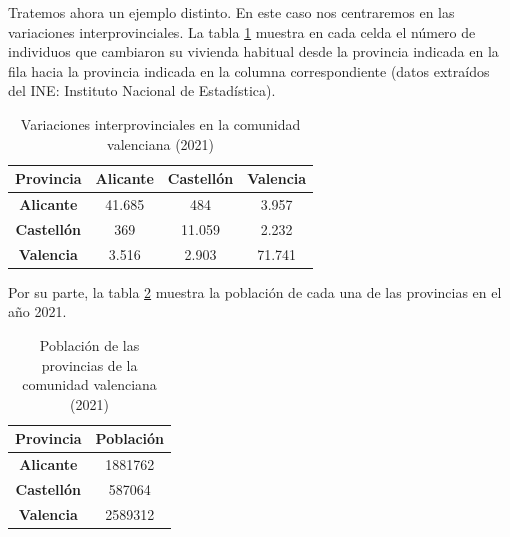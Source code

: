 \begin{ejemplo}
    Tratemos ahora un ejemplo distinto. En este caso nos centraremos en las variaciones interprovinciales. La tabla \ref{tab:variaciones} muestra en cada celda el número de individuos que cambiaron su vivienda habitual desde la provincia indicada en la fila hacia la provincia indicada en la columna correspondiente (datos extraídos del INE: Instituto Nacional de Estadística).

    \begin{table}[h]
        \centering
        \begin{tabular}{cccc}\hline
            \textbf{Provincia} & \textbf{Alicante} & \textbf{Castellón} & \textbf{Valencia} \\ \hline\hline
        \textbf{Alicante}                  & 41.685                    & 484                         & 3.957                      \\ \hline
        \textbf{Castellón}                & 369                       & 11.059                      & 2.232                      \\ \hline
        \textbf{Valencia}                & 3.516                     & 2.903                       & 71.741 \\ \hline            
        \end{tabular}
        \caption{Variaciones interprovinciales en la comunidad valenciana (2021)}
        \label{tab:variaciones}
        \end{table}


        Por su parte, la tabla \ref{tab:poblacion} muestra la población de cada una de las provincias en el año 2021. 

        \begin{table}[h]
            \centering
            \begin{tabular}{cc}\hline
                \textbf{Provincia}  & \textbf{Población} \\ \hline\hline
                \textbf{Alicante} &  1881762 \\ \hline
                \textbf{Castellón} & 587064 \\ \hline
                \textbf{Valencia} & 2589312 \\ \hline
            \end{tabular}
            \caption{Población de las provincias de la comunidad valenciana (2021)}
            \label{tab:poblacion}
        \end{table}


\end{ejemplo}
